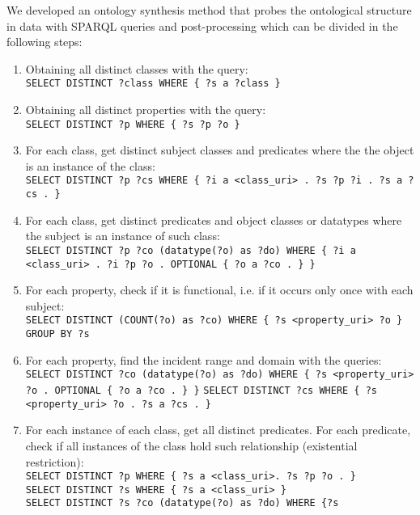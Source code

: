 \documentclass[review]{elsarticle}
\begin{document}
We developed an ontology synthesis method that probes the ontological structure in data with
SPARQL queries and post-processing which can be divided in the following steps:
\begin{enumerate}[leftmargin=0cm]
    \item Obtaining all distinct classes with the query:\\
        \texttt{SELECT DISTINCT ?class WHERE \{ ?s a ?class \}}
    \item Obtaining all distinct properties with the query:\\
        \texttt{SELECT DISTINCT ?p WHERE \{ ?s ?p ?o \}}
    \item For each class, get distinct subject classes and predicates where the
        the object is an instance of the class:\\
        \texttt{SELECT DISTINCT ?p ?cs WHERE \{ ?i a <class\_uri> . ?s ?p ?i . ?s
        a ?cs . \}}
    \item For each class, get distinct predicates and object classes or
        datatypes where the subject is an instance of such class:\\
        \texttt{SELECT DISTINCT ?p ?co (datatype(?o) as ?do) WHERE \{ ?i
                a <class\_uri> . ?i ?p ?o . OPTIONAL \{ ?o a ?co . \} \}}
    \item For each property, check if it is functional, i.e. if it
        occurs only once with each subject:\\
        \texttt{SELECT DISTINCT (COUNT(?o) as ?co) WHERE \{ ?s
            <property\_uri> ?o \} GROUP BY ?s}
    \item For each property, find the incident range and domain with the
        queries:\\
        \texttt{SELECT DISTINCT ?co (datatype(?o) as ?do) WHERE \{ ?s
                <property\_uri> ?o . OPTIONAL \{ ?o a ?co . \} \}}
        \texttt{SELECT DISTINCT ?cs WHERE \{ ?s <property\_uri> ?o . ?s a ?cs . \}}
    \item For each instance of each class, get all distinct predicates.
        For each predicate, check if all instances of the class
        hold such relationship (existential restriction):\\
        \texttt{SELECT DISTINCT ?p WHERE \{ ?s a <class\_uri>. ?s ?p ?o
        . \}}\\
        \texttt{SELECT DISTINCT ?s WHERE \{ ?s a <class\_uri> \}}\\
        \texttt{SELECT DISTINCT ?s ?co  (datatype(?o) as ?do) WHERE \{?s
}
\end{enumerate}
\end{document}
